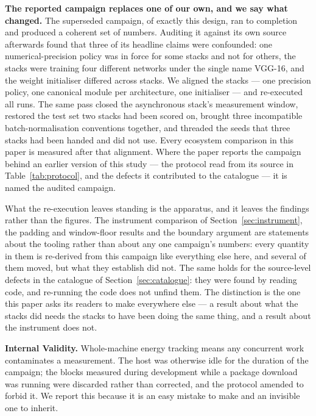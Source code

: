 \textbf{The reported campaign replaces one of our own, and we say what
changed.} The superseded campaign, of exactly this design, ran to completion and produced a
coherent set of numbers. Auditing it against its own source afterwards found
that three of its headline claims were confounded: one numerical-precision
policy was in force for some stacks and not for others, the \vEcosystems{}
stacks were training four different networks under the single name VGG-16, and
the weight initialiser differed across stacks. We aligned the stacks --- one precision
policy, one canonical module per architecture, one initialiser --- and
re-executed all \vRuns{} runs. The same pass closed the asynchronous stack's
measurement window, restored the test set two stacks had been scored on, brought
three incompatible batch-normalisation conventions together, and threaded the
seeds that three stacks had been handed and did not use. Every ecosystem
comparison in this paper is measured after that alignment. Where the paper
reports the campaign behind an earlier version of this study --- the protocol
read from its source in Table~\ref{tab:protocol}, and the defects it
contributed to the catalogue --- it is named the audited campaign.

What the re-execution leaves standing is the apparatus, and it leaves the
findings rather than the figures. The instrument comparison of
Section~\ref{sec:instrument}, the padding and window-floor results and the
boundary argument are statements about the tooling rather than about any one
campaign's numbers: every quantity in them is re-derived from this campaign like
everything else here, and several of them moved, but what they establish did
not. The same holds for the source-level defects in the catalogue of
Section~\ref{sec:catalogue}: they were found by reading code, and re-running the
code does not unfind them. The distinction is the one this paper asks its
readers to make everywhere else --- a result about what the stacks did needs the
stacks to have been doing the same thing, and a result about the instrument does
not.

\textbf{Internal Validity.}
Whole-machine energy tracking means any concurrent work contaminates a
measurement. The host was otherwise idle for the duration of the campaign; the
blocks measured during development while a package download was running were
discarded rather than corrected, and the protocol amended to forbid it. We
report this because it is an easy mistake to make and an invisible one to
inherit.

